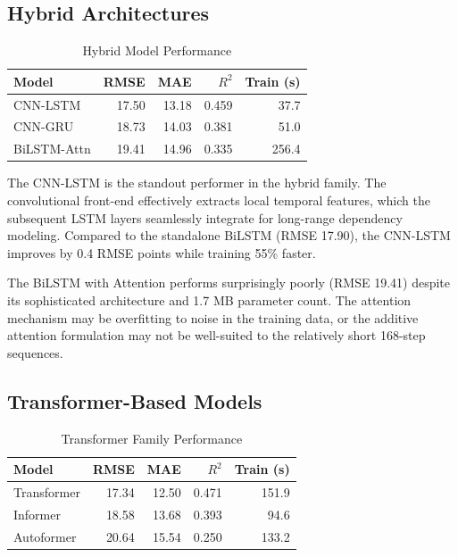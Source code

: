 \subsection{Hybrid Architectures}

\begin{table}[H]
\centering
\caption{Hybrid Model Performance}
\label{tab:hybrid_family}
\begin{tabular}{lrrrr}
\toprule
\textbf{Model} & \textbf{RMSE} & \textbf{MAE} & \textbf{$R^2$} & \textbf{Train (s)} \\
\midrule
CNN-LSTM & 17.50 & 13.18 & 0.459 & 37.7 \\
CNN-GRU & 18.73 & 14.03 & 0.381 & 51.0 \\
BiLSTM-Attn & 19.41 & 14.96 & 0.335 & 256.4 \\
\bottomrule
\end{tabular}
\end{table}

The CNN-LSTM is the standout performer in the hybrid family. The convolutional front-end effectively extracts local temporal features, which the subsequent LSTM layers seamlessly integrate for long-range dependency modeling. Compared to the standalone BiLSTM (RMSE 17.90), the CNN-LSTM improves by 0.4 RMSE points while training 55\% faster.

The BiLSTM with Attention performs surprisingly poorly (RMSE 19.41) despite its sophisticated architecture and 1.7 MB parameter count. The attention mechanism may be overfitting to noise in the training data, or the additive attention formulation may not be well-suited to the relatively short 168-step sequences.

\subsection{Transformer-Based Models}

\begin{table}[H]
\centering
\caption{Transformer Family Performance}
\label{tab:transformer_family}
\begin{tabular}{lrrrr}
\toprule
\textbf{Model} & \textbf{RMSE} & \textbf{MAE} & \textbf{$R^2$} & \textbf{Train (s)} \\
\midrule
Transformer & 17.34 & 12.50 & 0.471 & 151.9 \\
Informer & 18.58 & 13.68 & 0.393 & 94.6 \\
Autoformer & 20.64 & 15.54 & 0.250 & 133.2 \\
\bottomrule
\end{tabular}
\end{table}

